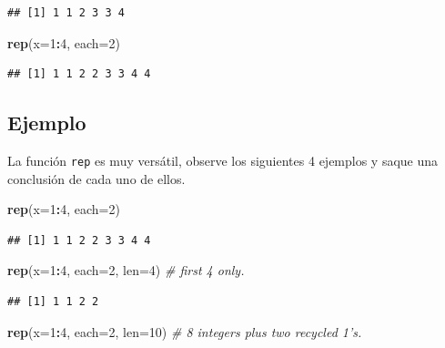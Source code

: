 \documentclass[10pt,]{krantz}
\makeatletter
\newenvironment{Shaded}{\begin{snugshade}}{\end{snugshade}}
\newcommand{\KeywordTok}[1]{\textcolor[rgb]{0.13,0.29,0.53}{\textbf{#1}}}
\newcommand{\DataTypeTok}[1]{\textcolor[rgb]{0.13,0.29,0.53}{#1}}
\newcommand{\DecValTok}[1]{\textcolor[rgb]{0.00,0.00,0.81}{#1}}
\newcommand{\CommentTok}[1]{\textcolor[rgb]{0.56,0.35,0.01}{\textit{#1}}}
\newcommand{\OperatorTok}[1]{\textcolor[rgb]{0.81,0.36,0.00}{\textbf{#1}}}
\newcommand{\NormalTok}[1]{#1}
\newenvironment{kframe}{%
\medskip{}
\setlength{\fboxsep}{.8em}
 \def\at@end@of@kframe{}%
 \ifinner\ifhmode%
  \def\at@end@of@kframe{\end{minipage}}%
  \begin{minipage}{\columnwidth}%
 \fi\fi%
 \def\FrameCommand##1{\hskip\@totalleftmargin \hskip-\fboxsep
 \colorbox{shadecolor}{##1}\hskip-\fboxsep
     \hskip-\linewidth \hskip-\@totalleftmargin \hskip\columnwidth}%
 \MakeFramed {\advance\hsize-\width
   \@totalleftmargin\z@ \linewidth\hsize
   \@setminipage}}%
 {\par\unskip\endMakeFramed%
 \at@end@of@kframe}
\renewenvironment{Shaded}{\begin{kframe}}{\end{kframe}}
\makeatother
\begin{document}
\begin{verbatim}
## [1] 1 1 2 3 3 4
\end{verbatim}

\begin{Shaded}
\begin{Highlighting}[]
\KeywordTok{rep}\NormalTok{(}\DataTypeTok{x=}\DecValTok{1}\OperatorTok{:}\DecValTok{4}\NormalTok{, }\DataTypeTok{each=}\DecValTok{2}\NormalTok{)}
\end{Highlighting}
\end{Shaded}

\begin{verbatim}
## [1] 1 1 2 2 3 3 4 4
\end{verbatim}

\subsection*{Ejemplo}\label{ejemplo-12}


La función \texttt{rep} es muy versátil, observe los siguientes 4
ejemplos y saque una conclusión de cada uno de ellos.

\begin{Shaded}
\begin{Highlighting}[]
\KeywordTok{rep}\NormalTok{(}\DataTypeTok{x=}\DecValTok{1}\OperatorTok{:}\DecValTok{4}\NormalTok{, }\DataTypeTok{each=}\DecValTok{2}\NormalTok{)}
\end{Highlighting}
\end{Shaded}

\begin{verbatim}
## [1] 1 1 2 2 3 3 4 4
\end{verbatim}

\begin{Shaded}
\begin{Highlighting}[]
\KeywordTok{rep}\NormalTok{(}\DataTypeTok{x=}\DecValTok{1}\OperatorTok{:}\DecValTok{4}\NormalTok{, }\DataTypeTok{each=}\DecValTok{2}\NormalTok{, }\DataTypeTok{len=}\DecValTok{4}\NormalTok{)    }\CommentTok{# first 4 only.}
\end{Highlighting}
\end{Shaded}

\begin{verbatim}
## [1] 1 1 2 2
\end{verbatim}

\begin{Shaded}
\begin{Highlighting}[]
\KeywordTok{rep}\NormalTok{(}\DataTypeTok{x=}\DecValTok{1}\OperatorTok{:}\DecValTok{4}\NormalTok{, }\DataTypeTok{each=}\DecValTok{2}\NormalTok{, }\DataTypeTok{len=}\DecValTok{10}\NormalTok{)   }\CommentTok{# 8 integers plus two recycled 1's.}
\end{Highlighting}
\end{Shaded}
\end{document}
